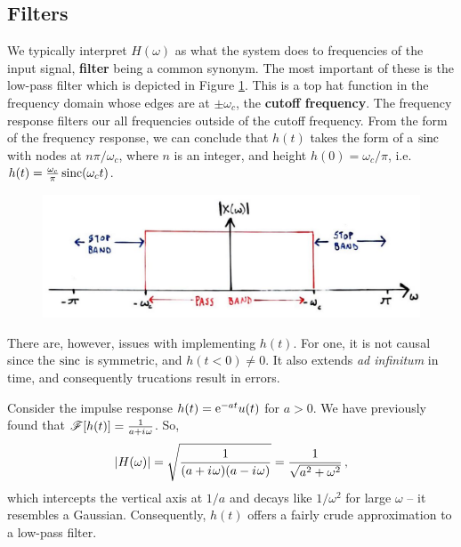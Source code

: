 \subsection{Filters}
%
We typically interpret $H(\omega)$ as what the system does to frequencies of the
input signal, \textbf{filter} being a common synonym. The most important of these
is the low-pass filter which is depicted in Figure \ref{fig::lecture_6_low_pass_filter}.
This is a top hat function in the frequency domain whose edges are at $\pm\omega_c$, the
\textbf{cutoff frequency}. The frequency response filters our all frequencies
outside of the cutoff frequency. From the form of the frequency response, we can
conclude that $h(t)$ takes the form of a $\operatorname{sinc}$ with nodes at $n\pi/\omega_c$, where
$n$ is an integer, and height $h(0) = \omega_c/\pi$, i.e.
$h(t) = \frac{\omega_c}{\pi}\operatorname{sinc}(\omega_c t)$.
%
\begin{figure}[!htb]
  \includegraphics[width=\textwidth]{images/lecture_6_low_pass_filter.JPG}
  \caption{
  }
  \label{fig::lecture_6_low_pass_filter}
\end{figure}
%
There are, however, issues with implementing $h(t)$. For one, it is not causal
since the $\operatorname{sinc}$ is symmetric, and $h(t<0) \neq 0$. It also extends
\textit{ad infinitum} in time, and consequently trucations result in errors.
%
\begin{exmp}
  Consider the impulse response $h(t) =\mathrm{e}^{-at}u(t)$ for $a>0$. We have previously
  found that $\mathscr{F}[h(t)] = \frac{1}{a + {i\mkern1mu}\omega}$. So,
  \begin{displaymath}
    |H(\omega)| = \sqrt{\frac{1}{(a + {i\mkern1mu}\omega)(a - {i\mkern1mu}\omega)}}
    = \frac{1}{\sqrt{a^2 + \omega^2}} \,,
  \end{displaymath}
  which intercepts the vertical axis at $1/a$ and decays like $1/\omega^2$ for
  large $\omega$ -- it resembles a Gaussian. Consequently, $h(t)$ offers
  a fairly crude approximation to a low-pass filter.
\end{exmp}

